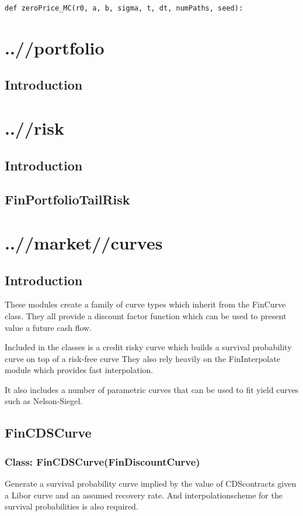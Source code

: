 \documentclass[twoside,11pt]{book}
\begin{document}
\begin{lstlisting}
def zeroPrice_MC(r0, a, b, sigma, t, dt, numPaths, seed):
\end{lstlisting}


\chapter{..//portfolio}
\section{Introduction}


\chapter{..//risk}
\section{Introduction}

\newpage
\section{FinPortfolioTailRisk}


\chapter{..//market//curves}
\section{Introduction}
These modules create a family of curve types which inherit from the FinCurve class. They all provide a discount factor function which can be used to present value a future cash flow. 

Included in the classes is a credit risky curve which builds a survival probability curve on top of a risk-free curve They also rely heavily on the FinInterpolate module which provides fast interpolation.

It also includes a number of parametric curves that can be used to fit yield curves such as Nelson-Siegel.
\newpage
\section{FinCDSCurve}

\subsection{Class: FinCDSCurve(FinDiscountCurve)}
Generate a survival probability curve implied by the value of CDScontracts given a Libor curve and an assumed recovery rate. And interpolationscheme for the survival probabilities is also required. 
\end{document}
